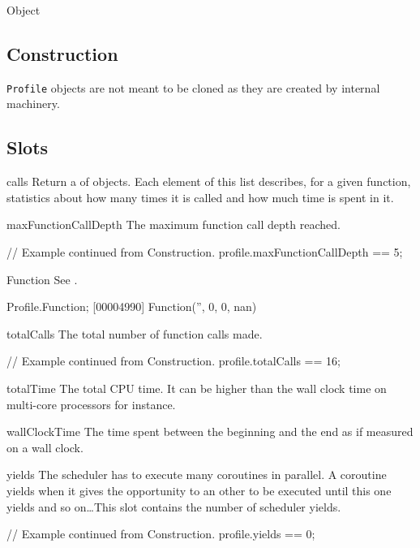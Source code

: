 \begin{refObjects}
\item[Object]
\end{refObjects}

\subsection{Construction}

\lstinline|Profile| objects are not meant to be cloned as they are created
by  internal machinery.

\subsection{Slots}

\begin{urbiscriptapi}

\item[calls]%
  Return a  of  objects. Each
  element of this list describes, for a given function, statistics about how
  many times it is called and how much time is spent in it.

\item[maxFunctionCallDepth]%
  The maximum function call depth reached.
\begin{urbiassert}
// Example continued from Construction.
profile.maxFunctionCallDepth == 5;
\end{urbiassert}

\item[Function]
  See .
\begin{urbiscript}
Profile.Function;
[00004990] Function('', 0, 0, nan)
\end{urbiscript}

\item[totalCalls]%
  The total number of function calls made.
\begin{urbiassert}
// Example continued from Construction.
profile.totalCalls == 16;
\end{urbiassert}

\item[totalTime]%
  The total CPU time. It can be higher than the wall clock time on
  multi-core processors for instance.

\item[wallClockTime]%
  The time spent between the beginning and the end as if measured on a wall
  clock.

\item[yields]%
  The scheduler has to execute many coroutines in parallel. A coroutine
  yields when it gives the opportunity to an other to be executed until this
  one yields and so on\dots This slot contains the number of scheduler
  yields.
\begin{urbiassert}
// Example continued from Construction.
profile.yields == 0;
\end{urbiassert}
\end{urbiscriptapi}


